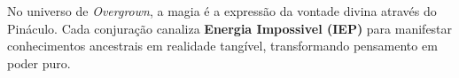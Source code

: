 No universo de \textit{Overgrown}, a magia é a expressão da vontade divina através do Pináculo. Cada conjuração canaliza \textbf{Energia Impossivel (IEP)} para manifestar conhecimentos ancestrais em realidade tangível, transformando pensamento em poder puro.